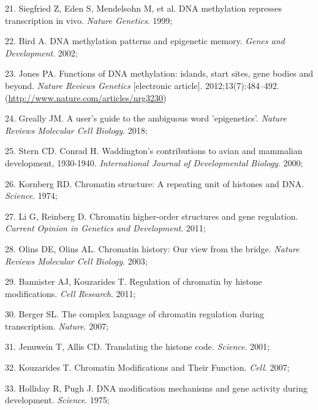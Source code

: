 \documentclass[11pt,twoside]{bristolthesis}
\newenvironment{cslreferences}%
  {}%
  {\par}
\begin{document}
\begin{cslreferences}
\leavevmode\hypertarget{ref-Siegfried1999}{}%
21. Siegfried Z, Eden S, Mendelsohn M, et al. DNA methylation represses transcription in vivo. \emph{Nature Genetics}. 1999;

\leavevmode\hypertarget{ref-Bird2002}{}%
22. Bird A. DNA methylation patterns and epigenetic memory. \emph{Genes and Development}. 2002;

\leavevmode\hypertarget{ref-Jones2012}{}%
23. Jones PA. Functions of DNA methylation: islands, start sites, gene bodies and beyond. \emph{Nature Reviews Genetics} {[}electronic article{]}. 2012;13(7):484--492. (\url{http://www.nature.com/articles/nrg3230})

\leavevmode\hypertarget{ref-Greally2018}{}%
24. Greally JM. A user's guide to the ambiguous word 'epigenetics'. \emph{Nature Reviews Molecular Cell Biology}. 2018;

\leavevmode\hypertarget{ref-Stern2000}{}%
25. Stern CD. Conrad H. Waddington's contributions to avian and mammalian development, 1930-1940. \emph{International Journal of Developmental Biology}. 2000;

\leavevmode\hypertarget{ref-Kornberg1974}{}%
26. Kornberg RD. Chromatin structure: A repeating unit of histones and DNA. \emph{Science}. 1974;

\leavevmode\hypertarget{ref-Li2011}{}%
27. Li G, Reinberg D. Chromatin higher-order structures and gene regulation. \emph{Current Opinion in Genetics and Development}. 2011;

\leavevmode\hypertarget{ref-Olins2003}{}%
28. Olins DE, Olins AL. Chromatin history: Our view from the bridge. \emph{Nature Reviews Molecular Cell Biology}. 2003;

\leavevmode\hypertarget{ref-Bannister2011}{}%
29. Bannister AJ, Kouzarides T. Regulation of chromatin by histone modifications. \emph{Cell Research}. 2011;

\leavevmode\hypertarget{ref-Berger2007}{}%
30. Berger SL. The complex language of chromatin regulation during transcription. \emph{Nature}. 2007;

\leavevmode\hypertarget{ref-Jenuwein2001}{}%
31. Jenuwein T, Allis CD. Translating the histone code. \emph{Science}. 2001;

\leavevmode\hypertarget{ref-Kouzarides2007}{}%
32. Kouzarides T. Chromatin Modifications and Their Function. \emph{Cell}. 2007;

\leavevmode\hypertarget{ref-Holliday1975}{}%
33. Holliday R, Pugh J. DNA modification mechanisms and gene activity during development. \emph{Science}. 1975;


\end{cslreferences}
\end{document}
